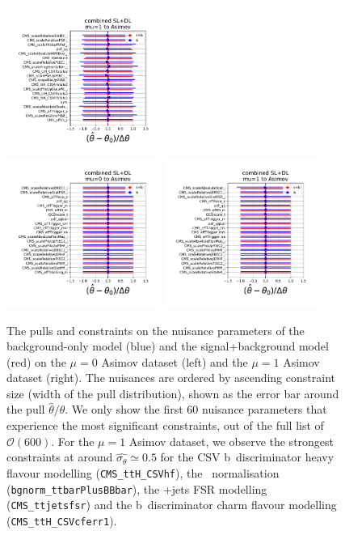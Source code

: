 \begin{figure}
\begin{centering}
\includegraphics[width=0.45\textwidth]{figures/tth/pulls_group_sldl_sig1_r20_40_asimov.pdf}\\
\includegraphics[width=0.45\textwidth]{figures/tth/pulls_group_sldl_sig0_r40_60_asimov.pdf}
\includegraphics[width=0.45\textwidth]{figures/tth/pulls_group_sldl_sig1_r40_60_asimov.pdf}
\caption[The pulls and constraints of the combined fit model with the Asimov datasets]{The pulls and constraints on the nuisance parameters of the background-only model (blue) and the signal+background model (red) on the $\mu=0$ Asimov dataset (left) and the $\mu=1$ Asimov dataset (right). The nuisances are ordered by ascending constraint size (width of the pull distribution), shown as the error bar around the pull $\hat{\theta} / \theta$.  We only show the first 60 nuisance parameters that experience the most significant constraints, out of the full list of $\mathcal{O}(600)$. For the $\mu=1$ Asimov dataset, we observe the strongest constraints at around $\hat{\sigma_{\theta}} \simeq 0.5$ for the CSV b~discriminator heavy flavour modelling (\texttt{CMS\_ttH\_CSVhf}), the \ttbb~normalisation (\texttt{bgnorm\_ttbarPlusBBbar}), the \ttbar+jets FSR modelling (\texttt{CMS\_ttjetsfsr}) and the b~discriminator charm flavour modelling (\texttt{CMS\_ttH\_CSVcferr1}).}
\label{fig:tth_sldl_pulls}
\end{centering}
\end{figure}


